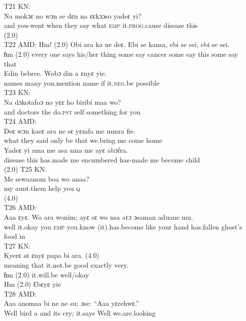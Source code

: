 \documentclass[output=paper,colorlinks,citecolor=brown]{langscibook}
\begin{document}
\ex\label{ex:obeng:21}
    T21 KN:\\
    \gll    Na mokɔɛ no wɔn se dɛn na ɛɛkɔɔso yadeɛ yi?\\
            and you-went when they say what \textsc{emp} it.\textsc{prog}.cause disease this\\
            (2.0) \\
\ex\label{ex:obeng:22}
    T22 AMD:
    \ea
    \gll    Hm! (2.0) Obi ara ka ne deɛ. Ebi se kansa, ebi se sei, ebi se sei. \\
            ɦm (2.0) every one says his/her thing some say cancer some say this some say that \\
    \ex
    \gll    Edin bebree. Wobɔ din a ɛnyɛ yie.\\
            names many you.mention name if it.\textsc{neg}.be possible \\
    \z
\ex\label{ex:obeng:23}
    T23 KN:\\
    \gll    Na dɔkotafoɔ no yɛɛ ho biribi maa wo?\\
            and doctors the do.\textsc{pst} self something for you\\
\ex\label{ex:obeng:24}
    T24 AMD:\\
    \ea
    \gll    Deɛ wɔn kaeɛ ara ne sɛ yɛmfa me mmra fie. \\
            what they said only be that we.bring me come home\\
    \ex     
    \gll    Yadeɛ yi ama me asa ama me ayɛ abɔfra.\\
            disease this has.made me encumbered has-made me become child\\
            (2.0)
    \z
\ex\label{ex:obeng:25}
    T25 KN:\\
    \gll    Me sewaanom boa wo anaa? \\
            my aunt.them help you \textsc{q}\\
            (4.0)\\
\ex\label{ex:obeng:26}
    T26 AMD:\\
    \gll    Aaa ɛyɛ. Wo ara wonim; ayɛ sɛ wo nsa atɔ ɔsaman aduane mu.\\
            well it.okay you \textsc{emp} you.know (it).has.become like your hand has.fallen ghost’s food in\\
\ex\label{ex:obeng:27}
    T27 KN:\\
    \ea
    \gll    Kyerɛ sɛ ɛnyɛ papa bi ara. (4.0) \\
            meaning that it.not.be good exactly very. \\ 
    \ex     
    \gll    ɦm (2.0) it.will.be well/okay\\
            Hm (2.0) Ɛbɛyɛ yie\\
    \z
\ex\label{ex:obeng:28}
    T28 AMD:\\
    \gll    Aaa anomaa bi ne ne su; ɔse: “Aaa yɛrehwɛ.”\\
            Well bird a and its cry; it.says Well we.are.looking \\
\z
\end{document}
